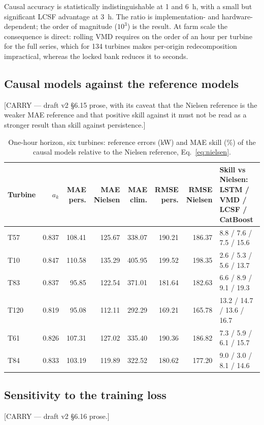 \documentclass[review,3p,times]{elsarticle}
\newcommand{\carry}[1]{\textsf{\small [CARRY --- #1]}}
\begin{document}
Causal accuracy is statistically indistinguishable at 1 and 6~h, with a small
but significant LCSF advantage at 3~h. The ratio is implementation- and
hardware-dependent; the order of magnitude ($10^3$) is the result. At farm
scale the consequence is direct: rolling VMD requires on the order of an hour
per turbine for the full series, which for 134 turbines makes per-origin
redecomposition impractical, whereas the locked bank reduces it to seconds.

\subsection{Causal models against the reference models}
\carry{draft v2 §6.15 prose, with its caveat that the Nielsen reference is the
weaker MAE reference and that positive skill against it must not be read as a
stronger result than skill against persistence.}

\begin{table}[htbp]\centering
\caption{One-hour horizon, six turbines: reference errors (kW) and MAE skill
(\%) of the causal models relative to the Nielsen reference,
Eq.~\eqref{eq:nielsen}.}
\label{tab:reference}
\scriptsize
\begin{tabular}{lrrrrrrl}
\toprule
Turbine & $a_k$ & MAE pers. & MAE Nielsen & MAE clim. & RMSE pers. &
RMSE Nielsen & Skill vs Nielsen: LSTM / VMD / LCSF / CatBoost \\
\midrule
T57  & 0.837 & 108.41 & 125.67 & 338.07 & 190.21 & 186.37 & 8.8 / 7.6 / 7.5 / 15.6 \\
T10  & 0.847 & 110.58 & 135.29 & 405.95 & 199.52 & 198.35 & 2.6 / 5.3 / 5.6 / 13.7 \\
T83  & 0.837 &  95.85 & 122.54 & 371.01 & 181.64 & 182.63 & 6.6 / 8.9 / 9.1 / 19.3 \\
T120 & 0.819 &  95.08 & 112.11 & 292.29 & 169.21 & 165.78 & 13.2 / 14.7 / 13.6 / 16.7 \\
T61  & 0.826 & 107.31 & 127.02 & 335.40 & 190.36 & 186.82 & 7.3 / 5.9 / 6.1 / 15.7 \\
T84  & 0.833 & 103.19 & 119.89 & 322.52 & 180.62 & 177.20 & 9.0 / 3.0 / 8.1 / 14.6 \\
\bottomrule
\end{tabular}
\end{table}

\subsection{Sensitivity to the training loss}
\carry{draft v2 §6.16 prose.}
\end{document}
